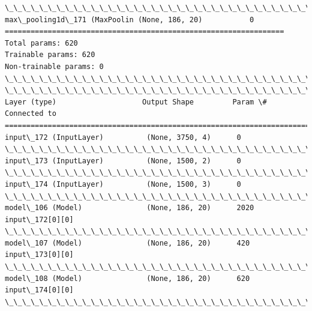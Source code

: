 \documentclass[11pt]{article}
\begin{document}
\begin{Verbatim}[commandchars=\\\{\}]
\_\_\_\_\_\_\_\_\_\_\_\_\_\_\_\_\_\_\_\_\_\_\_\_\_\_\_\_\_\_\_\_\_\_\_\_\_\_\_\_\_\_\_\_\_\_\_\_\_\_\_\_\_\_\_\_\_\_\_\_\_\_\_\_\_
max\_pooling1d\_171 (MaxPoolin (None, 186, 20)           0         
=================================================================
Total params: 620
Trainable params: 620
Non-trainable params: 0
\_\_\_\_\_\_\_\_\_\_\_\_\_\_\_\_\_\_\_\_\_\_\_\_\_\_\_\_\_\_\_\_\_\_\_\_\_\_\_\_\_\_\_\_\_\_\_\_\_\_\_\_\_\_\_\_\_\_\_\_\_\_\_\_\_
\_\_\_\_\_\_\_\_\_\_\_\_\_\_\_\_\_\_\_\_\_\_\_\_\_\_\_\_\_\_\_\_\_\_\_\_\_\_\_\_\_\_\_\_\_\_\_\_\_\_\_\_\_\_\_\_\_\_\_\_\_\_\_\_\_\_\_\_\_\_\_\_\_\_\_\_\_\_\_\_\_\_\_\_\_\_\_\_\_\_\_\_\_\_\_\_\_\_
Layer (type)                    Output Shape         Param \#     Connected to                     
==================================================================================================
input\_172 (InputLayer)          (None, 3750, 4)      0                                            
\_\_\_\_\_\_\_\_\_\_\_\_\_\_\_\_\_\_\_\_\_\_\_\_\_\_\_\_\_\_\_\_\_\_\_\_\_\_\_\_\_\_\_\_\_\_\_\_\_\_\_\_\_\_\_\_\_\_\_\_\_\_\_\_\_\_\_\_\_\_\_\_\_\_\_\_\_\_\_\_\_\_\_\_\_\_\_\_\_\_\_\_\_\_\_\_\_\_
input\_173 (InputLayer)          (None, 1500, 2)      0                                            
\_\_\_\_\_\_\_\_\_\_\_\_\_\_\_\_\_\_\_\_\_\_\_\_\_\_\_\_\_\_\_\_\_\_\_\_\_\_\_\_\_\_\_\_\_\_\_\_\_\_\_\_\_\_\_\_\_\_\_\_\_\_\_\_\_\_\_\_\_\_\_\_\_\_\_\_\_\_\_\_\_\_\_\_\_\_\_\_\_\_\_\_\_\_\_\_\_\_
input\_174 (InputLayer)          (None, 1500, 3)      0                                            
\_\_\_\_\_\_\_\_\_\_\_\_\_\_\_\_\_\_\_\_\_\_\_\_\_\_\_\_\_\_\_\_\_\_\_\_\_\_\_\_\_\_\_\_\_\_\_\_\_\_\_\_\_\_\_\_\_\_\_\_\_\_\_\_\_\_\_\_\_\_\_\_\_\_\_\_\_\_\_\_\_\_\_\_\_\_\_\_\_\_\_\_\_\_\_\_\_\_
model\_106 (Model)               (None, 186, 20)      2020        input\_172[0][0]                  
\_\_\_\_\_\_\_\_\_\_\_\_\_\_\_\_\_\_\_\_\_\_\_\_\_\_\_\_\_\_\_\_\_\_\_\_\_\_\_\_\_\_\_\_\_\_\_\_\_\_\_\_\_\_\_\_\_\_\_\_\_\_\_\_\_\_\_\_\_\_\_\_\_\_\_\_\_\_\_\_\_\_\_\_\_\_\_\_\_\_\_\_\_\_\_\_\_\_
model\_107 (Model)               (None, 186, 20)      420         input\_173[0][0]                  
\_\_\_\_\_\_\_\_\_\_\_\_\_\_\_\_\_\_\_\_\_\_\_\_\_\_\_\_\_\_\_\_\_\_\_\_\_\_\_\_\_\_\_\_\_\_\_\_\_\_\_\_\_\_\_\_\_\_\_\_\_\_\_\_\_\_\_\_\_\_\_\_\_\_\_\_\_\_\_\_\_\_\_\_\_\_\_\_\_\_\_\_\_\_\_\_\_\_
model\_108 (Model)               (None, 186, 20)      620         input\_174[0][0]                  
\_\_\_\_\_\_\_\_\_\_\_\_\_\_\_\_\_\_\_\_\_\_\_\_\_\_\_\_\_\_\_\_\_\_\_\_\_\_\_\_\_\_\_\_\_\_\_\_\_\_\_\_\_\_\_\_\_\_\_\_\_\_\_\_\_\_\_\_\_\_\_\_\_\_\_\_\_\_\_\_\_\_\_\_\_\_\_\_\_\_\_\_\_\_\_\_\_\_

\end{Verbatim}
\end{document}
